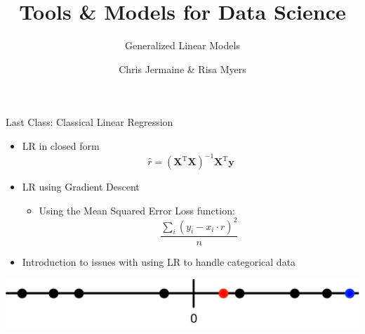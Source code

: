 \documentclass[aspectratio=169]{beamer}
\title[]
{Tools \& Models for Data Science}
\subtitle{Generalized Linear Models}
\author[]{Chris Jermaine \& Risa Myers}
\institute
{
  Rice University 
}
\date[]{}
\begin{document}
\begin{frame}
 \titlepage
\end{frame}

\begin{frame}{Last Class: Classical Linear Regression}
\begin{itemize}
\item LR in closed form
			$$\hat{r} = (\textbf{X}^{\textrm{T}}\textbf{X})^{-1}\textbf{X}^{\textrm{T}}\textbf{y}$$

\item LR using Gradient Descent
\begin{itemize}
\item Using the Mean Squared Error Loss function:
	$$\frac{\sum_i(y_i - x_i \cdot r)^2}{n}$$

\end{itemize}
\item Introduction to issues with using LR to handle categorical data
\end{itemize}
     \includegraphics[width=1\textwidth]{lectLR/yesNoCases.pdf} 
\end{frame}
\end{document}
